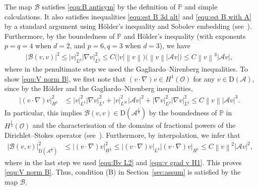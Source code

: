 \documentclass[11pt, reqno]{amsart}
\theoremstyle{definition}
\numberwithin{equation}{section}
\newcommand{\bb}{\mathbb}
\newcommand{\norm}[1]{\left\|{#1}\right\|}
\newcommand{\abs}[1]{\left|{#1}\right|}
\begin{document}
The map $\mathcal{B}$ satisfies \eqref{equ:B antisym} by the definition of $\bb{P}$ and simple calculations. It also satisfies inequalities \eqref{equ:est B 3d alt} and \eqref{equ:est B with A} by a standard argument using H\"older's inequality and Sobolev embedding (see~\cite{Tem01}). 
Furthermore, by the boundedness of $\bb{P}$ and H\"older's inequality (with exponents $p=q=4$ when $d=2$, and $p=6,q=3$ when $d=3$), we have
\begin{align}\label{equ:Bv L2}
    \abs{\mathcal{B}(v,v)}^2 \leq \abs{v}_{L^p}^2 \abs{\nabla v}_{L^q}^2 \leq C \big(\abs{v} \norm{v}\big) \big(\norm{v} \abs{\mathcal{A}v} \big) \leq
    C\norm{v}^3 \abs{\mathcal{A} v},
\end{align}
where in the penultimate step we used the Gagliardo--Nirenberg inequalities.
To show \eqref{equ:V norm B}, we first note that $(v\cdot\nabla)v\in H^1(\mathscr{O})$ for any $v\in \mathrm{D}(\mathcal{A})$, since by the H\"older and the Gagliardo--Nirenberg inequalities,
\begin{align}\label{equ:v grad v H1}
    \abs{(v\cdot\nabla)v}_{H^1}^2
    &\leq
    \abs{v}_{L^4}^2 \abs{\nabla v}_{L^4}^2
    +
    \abs{v}_{L^\infty}^2 \abs{\mathcal{A}v}^2 + \abs{\nabla v}_{L^p}^2 \abs{\nabla v}_{L^q}^2 
    \leq
    C \norm{v} \abs{\mathcal{A} v}^3.
\end{align}
In particular, this implies $\mathcal{B}(v,v)\in \mathrm{D}(\mathcal{A}^{\frac18})$ by the boundedness of $\bb{P}$ in $H^{\frac14}(\mathscr{O})$ and the characterisation of the domains of fractional powers of the Dirichlet--Stokes operator (see~\cite{FefHajRob22, KunWei17}).
Furthermore, by interpolation, we infer that
\begin{align}\label{equ:Bvv A18}
    \abs{\mathcal{B}(v,v)}_{\mathrm{D}(\mathcal{A}^{\frac18})}^2 
    &\leq
    \abs{(v\cdot\nabla)v}_{H^{\frac12}}^2 
    \leq 
    \abs{(v\cdot\nabla)v}_{L^2}
    \abs{(v\cdot\nabla)v}_{H^1}
    \leq
    C \norm{v}^2 \abs{\mathcal{A} v}^2,
\end{align}
where in the last step we used \eqref{equ:Bv L2} and \eqref{equ:v grad v H1}. This proves \eqref{equ:V norm B}. Thus, condition (B) in Section~\ref{sec:assum} is satisfied by the map $\mathcal{B}$.
\end{document}
